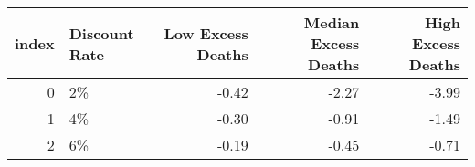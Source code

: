 \begin{tabular}{rlrrr}
\toprule
index & Discount Rate & Low Excess Deaths & Median Excess Deaths & High Excess Deaths \\
\midrule
0 & 2\% & -0.42 & -2.27 & -3.99 \\
1 & 4\% & -0.30 & -0.91 & -1.49 \\
2 & 6\% & -0.19 & -0.45 & -0.71 \\
\bottomrule
\end{tabular}
